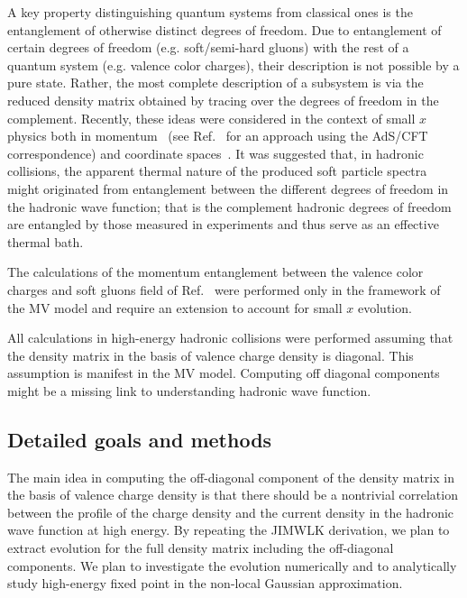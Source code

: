 	A key property distinguishing 
	quantum systems from classical ones is the entanglement 
	of otherwise distinct degrees of freedom. 
	Due to entanglement of certain degrees of freedom (e.g. soft/semi-hard gluons) 
	with the rest of a quantum system (e.g. valence color charges), their description
	is not possible by a pure state. 
	Rather, the most complete description of a subsystem 
 	is via the reduced density matrix
	obtained 
	by tracing over the degrees of freedom in the complement. 
	Recently, these ideas 
	were considered in the context of small $x$ physics 
	both in momentum~\cite{Kovner:2015hga} (see Ref.~\cite{Liu:2018gae} 
	for an approach using the AdS/CFT correspondence) and coordinate spaces~\cite{Kharzeev:2017qzs,Hagiwara:2017uaz}. 
	It was suggested that, in hadronic collisions,  the 
	apparent thermal nature of the produced soft 
	particle spectra
	might originated from entanglement between the different 
	degrees of freedom in the hadronic wave function; 
	that is the complement hadronic degrees of freedom 
	are entangled by those measured in experiments 
	and thus serve as an effective thermal bath. 


	The calculations of the momentum entanglement 
	between the valence color charges and soft gluons field 
 	of Ref.~\cite{Kovner:2015hga} were performed only in the framework of the 
	MV model and require an extension to account for small $x$ evolution. 

	All calculations in high-energy hadronic collisions 
	were performed assuming that the density matrix  in the basis 
	of valence charge density is diagonal. This assumption 
	is manifest in the MV model. Computing off diagonal 
	components might be a missing link to understanding 
	hadronic wave function. 


    \vspace{0.5em}
    \subsection{Detailed goals and methods}
        \label{sec:p21}
	The main idea in computing the off-diagonal component of the density matrix 
	in the basis  of valence charge density is that there should be a nontrivial 
	correlation between the profile of the charge density 
	and the current density in the hadronic wave function at high energy. 
	By repeating the JIMWLK derivation, we plan to extract evolution
	for the full density matrix including the off-diagonal components. We plan to investigate 
	the evolution numerically and to analytically study %
	high-energy fixed point in the non-local Gaussian approximation.  

